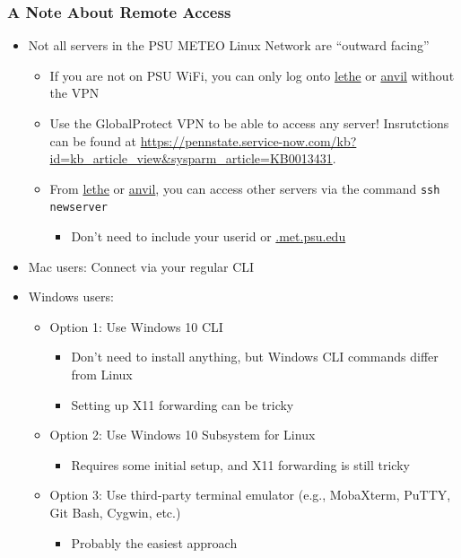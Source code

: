 \documentclass[hyperref,pdfa,unicode,utf8,usepdftitle]{beamer}
\begin{document}
\begin{frame}
  \frametitle{A Note About Remote Access}
  \begin{itemize}
  \item Not all servers in the PSU METEO Linux Network are ``outward facing''
    \begin{itemize}
    \item If you are not on PSU WiFi, you can only log onto \url{lethe} or
      \url{anvil} without the VPN
    \item Use the GlobalProtect VPN to be able to access any server!
      Insrutctions can be found at \url{https://pennstate.service-now.com/kb?id=kb_article_view&sysparm_article=KB0013431}.
    \item From \url{lethe} or \url{anvil}, you can access other
      servers via the command \lstinline{ssh newserver}
      \begin{itemize}
      \item Don’t need to include your userid or \url{.met.psu.edu}
      \end{itemize}
    \end{itemize}
  \item Mac users: Connect via your regular CLI
  \item Windows users:
    \begin{itemize}
    \item Option 1: Use Windows 10 CLI
      \begin{itemize}
      \item Don't need to install anything, but Windows CLI commands
        differ from Linux
      \item Setting up X11 forwarding can be tricky
      \end{itemize}
    \item Option 2: Use Windows 10 Subsystem for Linux
        \begin{itemize}
        \item Requires some initial setup, and X11 forwarding is still
          tricky
        \end{itemize}
      \item Option 3: Use third-party terminal emulator (e.g.,
        MobaXterm, PuTTY, Git Bash, Cygwin, etc.)
        \begin{itemize}
        \item Probably the easiest approach
        \end{itemize}
      \end{itemize}
  \end{itemize}
\end{frame}
\end{document}
